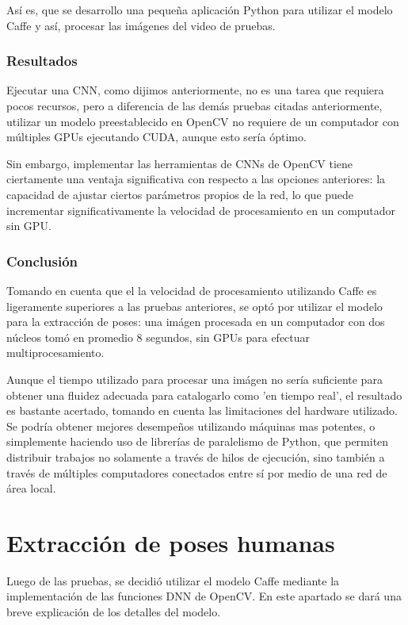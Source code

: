 \documentclass[a4paper,12pt,oneside,spanish]{book}
\begin{document}
Así es, que se desarrollo una pequeña aplicación Python para utilizar el modelo Caffe y así, procesar las imágenes del video de pruebas. 

\subsubsection{Resultados}
Ejecutar una CNN, como dijimos anteriormente, no es una tarea que requiera pocos recursos, pero a diferencia de las demás pruebas citadas anteriormente, utilizar un modelo preestablecido en OpenCV no requiere de un computador con múltiples GPUs ejecutando CUDA, aunque esto sería óptimo.\par

Sin embargo, implementar las herramientas de CNNs de OpenCV tiene ciertamente una ventaja significativa con respecto a las opciones anteriores: la capacidad de ajustar ciertos parámetros propios de la red, lo que puede incrementar significativamente la velocidad de procesamiento en un computador sin GPU.\par

\subsubsection{Conclusión}
Tomando en cuenta que el la velocidad de procesamiento utilizando Caffe es ligeramente superiores a las pruebas anteriores, se optó por utilizar el modelo para la extracción de poses: una imágen procesada en un computador con dos núcleos tomó en promedio 8 segundos, sin GPUs para efectuar multiprocesamiento.\par

Aunque el tiempo utilizado para procesar una imágen no sería suficiente para obtener una fluidez adecuada para catalogarlo como 'en tiempo real', el resultado es bastante acertado, tomando en cuenta las limitaciones del hardware utilizado. Se podría obtener mejores desempeños utilizando máquinas mas potentes, o simplemente haciendo uso de librerías de paralelismo de Python, que permiten distribuir trabajos no solamente a través de hilos de ejecución, sino también a través de múltiples computadores conectados entre sí por medio de una red de área local.\par


\section{Extracción de poses humanas}
Luego de las pruebas, se decidió utilizar el modelo Caffe mediante la implementación de las funciones DNN de OpenCV. En este apartado se dará una breve explicación de los detalles del modelo.\par
\end{document}
